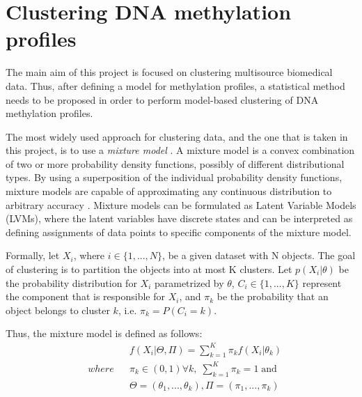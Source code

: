 \section{Clustering DNA methylation profiles} \label{cluster-meth-s}

The main aim of this project is focused on clustering multisource biomedical data. Thus, after defining a model for methylation profiles, a statistical method needs to be proposed in order to perform model-based clustering of DNA methylation profiles.

The most widely used approach for clustering data, and the one that is taken in this project, is to use a \emph{mixture model} \citep{McLachlan1988}. A mixture model is a convex combination of two or more probability density functions, possibly of different distributional types. By using a superposition of the individual probability density functions, mixture models are capable of approximating any continuous distribution to arbitrary accuracy \citep{Marin2005}. Mixture models can be formulated as Latent Variable Models (LVMs), where the latent variables have discrete states and can be interpreted as defining assignments of data points to specific components of the mixture model.

Formally, let $X_{i}$, where $i \in \lbrace 1, ... , N \rbrace$, be a given dataset with N objects. The goal of clustering is to partition the objects into at most K clusters. Let $p(X_{i}|\theta)$ be the probability distribution for $X_{i}$ parametrized by $\theta$, $C_{i} \in \lbrace 1,...,K \rbrace$ represent the  component that is responsible for $X_{i}$, and $\pi_{k}$ be the probability that an object belongs to cluster $k$, i.e. $\pi_{k} = P(C_{i} = k)$. 

Thus, the mixture model is defined as follows:
\begin{equation}
	\begin{aligned}
		& 
		& & f(X_{i}|\Theta, \Pi) = \sum_{k=1}^{K}\pi_{k}f(X_{i}|\theta_{k}) \\
		& where 
		& & \pi_{k} \in (0, 1) \forall k, \; \sum_{k=1}^{K}\pi_{k} = 1  \; \text{and} \\
		& 
		& & \Theta = (\theta_{1},...,\theta_{k}), \Pi = (\pi_{1},..., \pi_{k})
	\end{aligned}
\end{equation}

